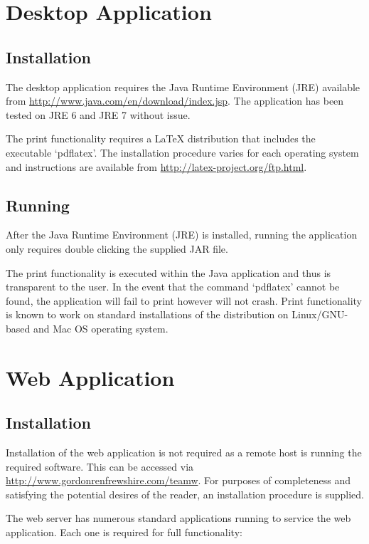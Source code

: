 \section{Desktop Application}

\subsection{Installation}

The desktop application requires the Java Runtime Environment (JRE) available 
from \url{http://www.java.com/en/download/index.jsp}. The application has been 
tested on JRE 6 and JRE 7 without issue.

The print functionality requires a LaTeX distribution that includes the
executable `pdflatex'. The installation procedure varies for each operating
system and instructions are available from
\url{http://latex-project.org/ftp.html}.

\subsection{Running}

After the Java Runtime Environment (JRE) is installed, running the application
only requires double clicking the supplied JAR file.

The print functionality is executed within the Java application and thus is
transparent to the user. In the event that the command `pdflatex' cannot be
found, the application will fail to print however will not crash. Print
functionality is known to work on standard installations of the distribution
on Linux/GNU-based and Mac OS operating system.

\section{Web Application}

\subsection{Installation}

Installation of the web application is not required as a remote host is running
the required software. This can be accessed via 
\url{http://www.gordonrenfrewshire.com/teamw}. For purposes of completeness
and satisfying the potential desires of the reader, an installation procedure
is supplied.

The web server has numerous standard applications running to service the web
application. Each one is required for full functionality:

